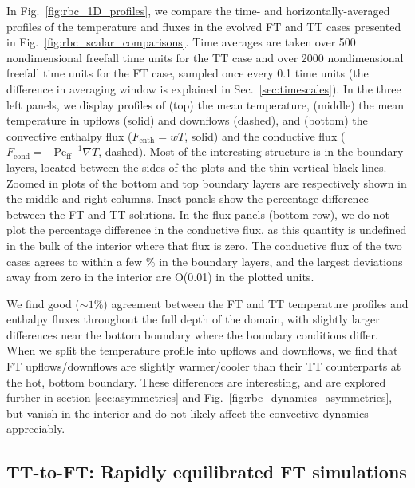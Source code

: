 \documentclass[aps, pre, onecolumn, nofootinbib, notitlepage, groupedaddress, amsfonts, amssymb, amsmath, longbibliography, superscriptaddress]{revtex4-1}
\newcommand{\grad}{\ensuremath{\nabla}}
\newcommand{\Peff}{\ensuremath{\text{Pe}_{\text{ff}}}}
\begin{document}
In Fig.~\ref{fig:rbc_1D_profiles}, we compare the time- and horizontally-averaged profiles of the temperature and fluxes in the evolved FT and TT cases presented in Fig.~\ref{fig:rbc_scalar_comparisons}.
Time averages are taken over 500 nondimensional freefall time units for the TT case and over 2000 nondimensional freefall time units for the FT case, sampled once every 0.1 time units (the difference in averaging window is explained in Sec.~\ref{sec:timescales}).
In the three left panels, we display profiles of (top) the mean temperature, (middle) the mean temperature in upflows (solid) and downflows (dashed), and (bottom) the convective enthalpy flux ($F_{\text{enth}} = wT$, solid) and the conductive flux ($F_{\text{cond}} = -\Peff^{-1}\grad T$, dashed).
Most of the interesting structure is in the boundary layers, located between the sides of the plots and the thin vertical black lines.
Zoomed in plots of the bottom and top boundary layers are respectively shown in the middle and right columns.
Inset panels show the percentage difference between the FT and TT solutions.
In the flux panels (bottom row), we do not plot the percentage difference in the conductive flux, as this quantity is undefined in the bulk of the interior where that flux is zero.
The conductive flux of the two cases agrees to within a few \% in the boundary layers, and the largest deviations away from zero in the interior are O(0.01) in the plotted units. 

We find good ($\sim 1\%$) agreement between the FT and TT temperature profiles and enthalpy fluxes throughout the full depth of the domain, with slightly larger differences near the bottom boundary where the boundary conditions differ.
When we split the temperature profile into upflows and downflows, we find that FT upflows/downflows are slightly warmer/cooler than their TT counterparts at the hot, bottom boundary.
These differences are interesting, and are explored further in section \ref{sec:asymmetries} and Fig.~\ref{fig:rbc_dynamics_asymmetries}, but vanish in the interior and do not likely affect the convective dynamics appreciably.

\subsection{TT-to-FT: Rapidly equilibrated FT simulations}
\label{sec:tt-to-ft}
\end{document}

